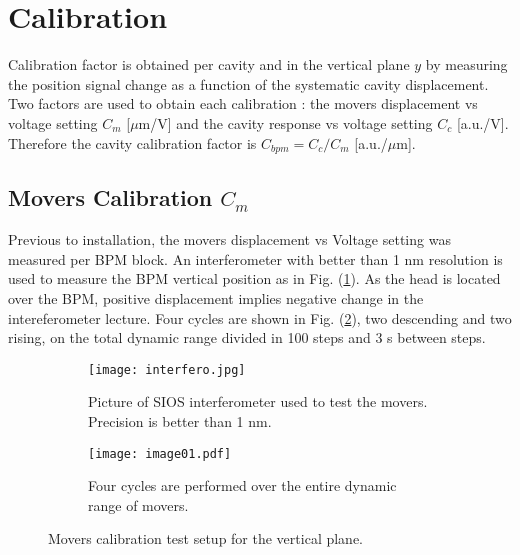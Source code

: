 \section{Calibration}\label{s:cals}
Calibration factor is obtained per cavity and in the vertical plane $y$ by measuring the position signal change as a function of the systematic cavity displacement. Two factors are used to obtain each calibration : the movers displacement vs voltage setting $C_m$ [$\mu$m/V] and the cavity response vs voltage setting $C_c$ [a.u./V]. Therefore the cavity calibration factor is $C_{bpm}=C_c/C_m$ [a.u./$\mu$m].\par
\subsection{Movers Calibration $C_m$}\label{s:calcm}
Previous to installation, the movers displacement vs Voltage setting was measured per BPM block. An interferometer with better than 1 nm resolution is used to measure the BPM vertical position as in Fig. (\ref{f:interfero}). As the head is located over the BPM, positive displacement implies negative change in the intereferometer lecture. Four cycles are shown in Fig. (\ref{f:fourcycles}), two descending and two rising, on the total dynamic range divided in 100 steps and 3 s between steps.\par
\begin{figure}[!htb]
\centering
\begin{subfigure}[b]{0.3\textwidth}
\texttt{[image: interfero.jpg]}\caption{Picture of SIOS interferometer used to test the movers. Precision is better than 1 nm.}\label{f:interfero}
\end{subfigure}\hspace*{1cm}
\begin{subfigure}[b]{0.5\textwidth}
\texttt{[image: image01.pdf]}\caption{Four cycles are performed over the entire dynamic range of movers.}\label{f:fourcycles}
\end{subfigure}\caption{Movers calibration test setup for the vertical plane.}\label{f:cmtest}
\end{figure}
